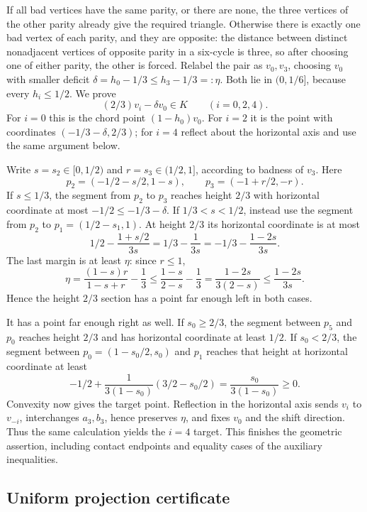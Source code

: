 \documentclass[
  10pt,
]{article}
\begin{document}
If all bad vertices have the same parity, or there are none, the three
vertices of the other parity already give the required triangle.
Otherwise there is exactly one bad vertex of each parity, and they are
opposite: the distance between distinct nonadjacent vertices of opposite
parity in a six-cycle is three, so after choosing one of either parity,
the other is forced. Relabel the pair as \(v_0,v_3\), choosing \(v_0\)
with smaller deficit \(\delta=h_0-1/3\le h_3-1/3=:\eta\). Both lie in
\((0,1/6]\), because every \(h_i\le1/2\). We prove \[
(2/3)v_i-\delta v_0\in K\qquad(i=0,2,4).
\] For \(i=0\) this is the chord point \((1-h_0)v_0\). For \(i=2\) it is
the point with coordinates \((-1/3-\delta,2/3)\); for \(i=4\) reflect
about the horizontal axis and use the same argument below.

Write \(s=s_2\in[0,1/2)\) and \(r=s_3\in(1/2,1]\), according to badness
of \(v_3\). Here \[
p_2=(-1/2-s/2,1-s),\qquad p_3=(-1+r/2,-r).
\] If \(s\le1/3\), the segment from \(p_2\) to \(p_3\) reaches height
\(2/3\) with horizontal coordinate at most \(-1/2\le-1/3-\delta\). If
\(1/3<s<1/2\), instead use the segment from \(p_2\) to
\(p_1=(1/2-s_1,1)\). At height \(2/3\) its horizontal coordinate is at
most \[
 1/2-\frac{1+s/2}{3s}=1/3-\frac1{3s}=-1/3-\frac{1-2s}{3s}.
\] The last margin is at least \(\eta\): since \(r\le1\), \[
\eta=\frac{(1-s)r}{1-s+r}-\frac13
   \le\frac{1-s}{2-s}-\frac13
   =\frac{1-2s}{3(2-s)}
   \le\frac{1-2s}{3s}.
\] Hence the height \(2/3\) section has a point far enough left in both
cases.

It has a point far enough right as well. If \(s_0\ge2/3\), the segment
between \(p_5\) and \(p_0\) reaches height \(2/3\) and has horizontal
coordinate at least \(1/2\). If \(s_0<2/3\), the segment between
\(p_0=(1-s_0/2,s_0)\) and \(p_1\) reaches that height at horizontal
coordinate at least \[
 -1/2+\frac{1}{3(1-s_0)}(3/2-s_0/2)
 =\frac{s_0}{3(1-s_0)}\ge0.
\] Convexity now gives the target point. Reflection in the horizontal
axis sends \(v_i\) to \(v_{-i}\), interchanges \(a_3,b_3\), hence
preserves \(\eta\), and fixes \(v_0\) and the shift direction. Thus the
same calculation yields the \(i=4\) target. This finishes the geometric
assertion, including contact endpoints and equality cases of the
auxiliary inequalities.

\subsection{Uniform projection
certificate}\label{uniform-projection-certificate}
\end{document}
